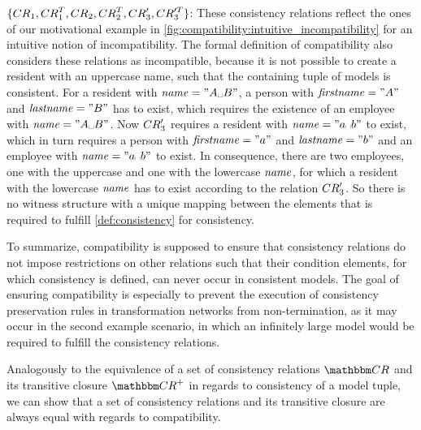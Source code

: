 \begin{example}
\begin{properdescription}
\item[$\setted{\consistencyrelation{CR}{1}, \consistencyrelation{CR}{1}^T, \consistencyrelation{CR}{2}, \consistencyrelation{CR}{2}^T, \consistencyrelation{CR}{3}', \consistencyrelation{CR}{3}'^T}$:]
These consistency relations reflect the ones of our motivational example in \autoref{fig:compatibility:intuitive_incompatibility} for an intuitive notion of incompatibility.
The formal definition of compatibility also considers these relations as incompatible, because it is not possible to create a resident with an uppercase name, such that the containing tuple of models is consistent.
For a resident with $\mathvariable{name} = "A\text{\textvisiblespace}B"$, a person with $\mathit{firstname} = "A"$ and $\mathit{lastname} = "B"$ has to exist, which requires the existence of an employee with $\mathvariable{name} = "A\text{\textvisiblespace}B"$. Now $\consistencyrelation{CR}{3}'$ requires a resident with $\mathvariable{name} = "a\text{\textvisiblespace}b"$ to exist, which in turn requires a person with $\mathit{firstname} = "a"$ and $\mathit{lastname} = "b"$ and an employee with $\mathvariable{name} = "a\text{\textvisiblespace}b"$ to exist.
In consequence, there are two employees, one with the uppercase and one with the lowercase $\mathit{name}$, for which a resident with the lowercase $\mathit{name}$ has to exist according to the relation $\consistencyrelation{CR}{3}'$. So there is no witness structure with a unique mapping between the elements that is required to fulfill \autoref{def:consistency} for consistency.
\end{properdescription}
\end{example}

To summarize, compatibility is supposed to ensure that consistency relations do not impose restrictions on other relations such that their condition elements, for which consistency is defined, can never occur in consistent models.
The goal of ensuring compatibility is especially to prevent the execution of consistency preservation rules in transformation networks from non-termination, as it may occur in the second example scenario, in which an infinitely large model would be required to fulfill the consistency relations.

Analogously to the equivalence of a set of consistency relations $\consistencyrelationset{CR}$ and its transitive closure $\transitiveclosure{\consistencyrelationset{CR}}$ in regards to consistency of a model tuple, we can show that a set of consistency relations and its transitive closure are always equal with regards to compatibility.

